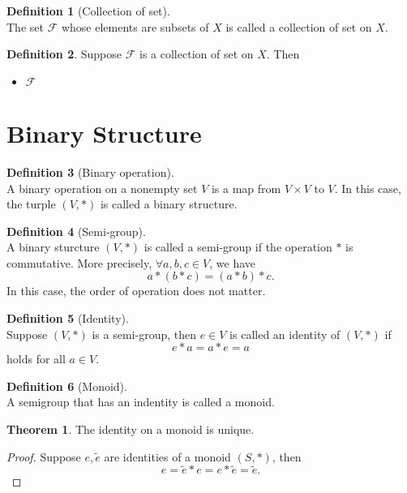 \documentclass[12pt]{book}
\theoremstyle{definition}
\newtheorem{definition}{Definition}[chapter]
\newtheorem{theorem}{Theorem}[chapter]
\begin{document}
\begin{definition}[Collection of set] \ \\
The set $\mathcal F$ whose elements are subsets of $X$ is called a collection of set on $X$.
\end{definition}

\begin{definition} Suppose $\mathcal F$ is a collection of set on $X$. Then 
	\begin{itemize}
		\item $\mathcal F$
	\end{itemize}
\end{definition}


\section{Binary Structure}
\begin{definition}[Binary operation] \ \\
A binary operation on a nonempty set $V$ is a map from $V \times V$ to $V$. In this case, the turple $(V,*)$ is called a binary structure.

\end{definition}

\begin{definition}[Semi-group] \ \\
A binary sturcture $(V,*)$ is called a semi-group if the operation $*$ is commutative. More precisely, $\forall a,b,c \in V$, we have
$$
a*(b*c) = (a*b)*c.
$$
In this case, the order of operation does not matter.
\end{definition}

\begin{definition}[Identity] \ \\
Suppose $(V,*)$ is a semi-group, then $e \in V$ is called an identity of $(V,*)$ if 
$$
e*a = a*e = a
$$
holds for all $a\in V$.
\end{definition}

\begin{definition}[Monoid] \ \\
A semigroup that has an indentity is called a monoid.
\end{definition}

\begin{theorem}
The identity on a monoid is unique.
\end{theorem}
\begin{proof}
Suppose $e,\tilde e$ are identities of a monoid $(S,*)$, then
$$
e = \tilde e *e = e*\tilde e= \tilde e.
$$	
\end{proof}
\end{document}
